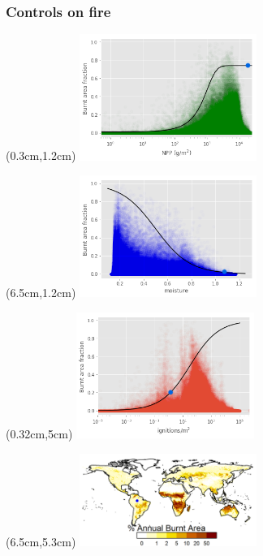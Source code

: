 \addtocounter{framenumber}{-1}
\begin{frame}
	\frametitle{Controls on fire}
	\begin{textblock*}{14cm}(0.3cm,1.2cm)
		\includegraphics[width=5.78cm]{images/limitCurves/RainF/NPPVsFire}	
	\end{textblock*}
	\begin{textblock*}{14cm}(6.5cm,1.2cm)
		\includegraphics[width=5.78cm]{images/limitCurves/RainF/alphaVsFire}	
	\end{textblock*}
	\begin{textblock*}{14cm}(0.32cm,5cm)
		\includegraphics[width=5.78cm]{images/limitCurves/RainF/ignitionsVsFire.png}		
	\end{textblock*}
	\begin{textblock*}{14cm}(6.5cm,5.3cm)
		\includegraphics[width=5.78cm]{images/limitCurves/RainF/fireMap.png}		
	\end{textblock*}
\end{frame}


